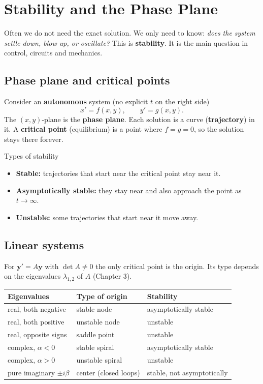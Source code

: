 \chapter{Stability and the Phase Plane}

Often we do not need the exact solution. We only need to know: \emph{does the system settle down, blow up, or oscillate?} This is \textbf{stability}. It is the main question in control, circuits and mechanics.

\section{Phase plane and critical points}

Consider an \textbf{autonomous} system (no explicit $t$ on the right side)
\[ x' = f(x,y), \qquad y' = g(x,y). \]
The $(x,y)$-plane is the \textbf{phase plane}. Each solution is a curve (\textbf{trajectory}) in it. A \textbf{critical point} (equilibrium) is a point where $f=g=0$, so the solution stays there forever.

\begin{defbox}{Types of stability}
\begin{itemize}
  \item \textbf{Stable:} trajectories that start near the critical point stay near it.
  \item \textbf{Asymptotically stable:} they stay near and also approach the point as $t\to\infty$.
  \item \textbf{Unstable:} some trajectories that start near it move away.
\end{itemize}
\end{defbox}

\section{Linear systems}

For $\mathbf{y}' = A\mathbf{y}$ with $\det A \neq 0$ the only critical point is the origin. Its type depends on the eigenvalues $\lambda_{1,2}$ of $A$ (Chapter 3).

\begin{center}
\renewcommand{\arraystretch}{1.35}
\begin{tabular}{@{}lll@{}}
\toprule
Eigenvalues & Type of origin & Stability \\
\midrule
real, both negative & stable node & asymptotically stable \\
real, both positive & unstable node & unstable \\
real, opposite signs & saddle point & unstable \\
complex, $\alpha<0$ & stable spiral & asymptotically stable \\
complex, $\alpha>0$ & unstable spiral & unstable \\
pure imaginary $\pm i\beta$ & center (closed loops) & stable, not asymptotically \\
\bottomrule
\end{tabular}
\end{center}

